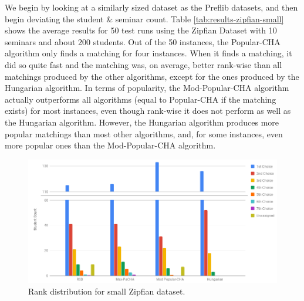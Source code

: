 \begin{table}[h!]
  \centering
  \caption{Average results for small Zipfian dataset with 50 runs}
  \label{tab:results-zipfian-small}
\end{table}

We begin by looking at a similarly sized dataset as the Preflib datasets, and then begin deviating the student \& seminar count. Table \ref{tab:results-zipfian-small} shows the average results for 50 test runs using the Zipfian Dataset with 10 seminars and about 200 students. Out of the 50 instances, the Popular-CHA algorithm only finds a matching for four instances. When it finds a matching, it did so quite fast and the matching was, on average, better rank-wise than all matchings produced by the other algorithms, except for the ones produced by the Hungarian algorithm. In terms of popularity, the Mod-Popular-CHA algorithm actually outperforms all algorithms (equal to Popular-CHA if the matching exists) for most instances, even though rank-wise it does not perform as well as the Hungarian algorithm. However, the Hungarian algorithm produces more popular matchings than most other algorithms, and, for some instances, even more popular ones than the Mod-Popular-CHA algorithm.

\begin{figure}[h!]
  \centering
    \includegraphics[width=0.75\linewidth]{assets/plots/small-zipfian-cropped.png}
    \caption{Rank distribution for small Zipfian dataset.}
    \label{fig:zipfian-small-distribution}
\end{figure}

